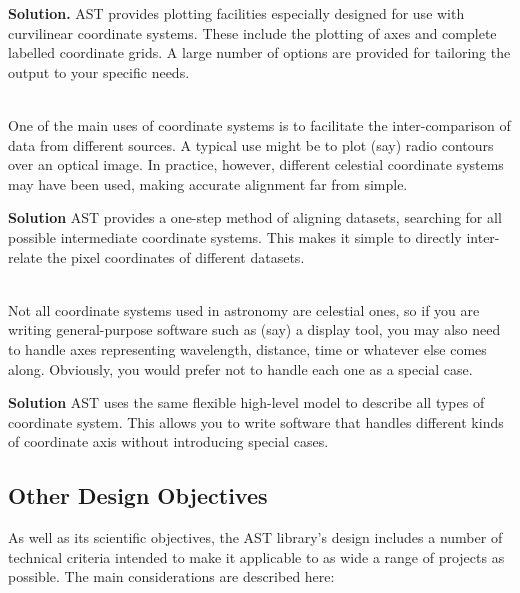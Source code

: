 \documentclass[twoside,11pt]{article}
\begin{document}
\begin{description}
{\bf{Solution.}} AST provides plotting facilities especially designed
for use with curvilinear coordinate systems. These include the
plotting of axes and complete labelled coordinate grids.  A large
number of options are provided for tailoring the output to your
specific needs.

\item[4. Aligning Data from Different Sources]\mbox{}\\
One of the main uses of coordinate systems is to facilitate the
inter-comparison of data from different sources. A typical use might
be to plot (say) radio contours over an optical image.  In practice,
however, different celestial coordinate systems may have been used,
making accurate alignment far from simple.

{\bf{Solution}} AST provides a one-step method of aligning datasets,
searching for all possible intermediate coordinate systems.  This
makes it simple to directly inter-relate the pixel coordinates of
different datasets.

\item[5. Handling Different Types of Coordinate Sy\mbox{}stem]\mbox{}\\
Not all coordinate systems used in astronomy are celestial ones, so if
you are writing general-purpose software such as (say) a display tool,
you may also need to handle axes representing wavelength, distance,
time or whatever else comes along. Obviously, you would prefer not to
handle each one as a special case.

{\bf{Solution}} AST uses the same flexible high-level model to
describe all types of coordinate system. This allows you to write
software that handles different kinds of coordinate axis without
introducing special cases.
\end{description}

\subsection{Other Design Objectives}

As well as its scientific objectives, the AST library's design
includes a number of technical criteria intended to make it applicable
to as wide a range of projects as possible. The main considerations
are described here:
\end{document}
